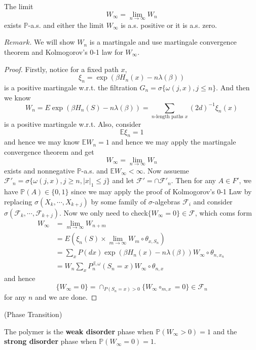 \begin{theorem}
    The limit
    \[W_{\infty} = \lim\limits_{n\to\infty} W_n\]
    exists $\mathbb{P}$-a.s. and either the limit $W_{\infty}$ is a.s. positive or it is a.s. zero.
\end{theorem}
$Remark$. We will show $W_n$ is a martingale and use martingale convergence theorem and Kolmogorov's 0-1 law for $W_{\infty}$.
\begin{proof}
    Firstly, notice for a fixed path $x$,
    \[
    \xi_n = \exp{(\beta H_n(x)- n\lambda(\beta))}
    \]
    is a positive martingale w.r.t. the filtration $G_n = \sigma\{\omega(j,x), j\leq n\}$. And then we know
    \[
    W_n = E \exp(\beta H_n(S) - n\lambda(\beta)) = \sum\limits_{n\text{-length paths }x}(2d)^{-1} \xi_n(x)
    \]
    is a positive martingale w.r.t. Also, consider
    \[
    \mathbb{E}\xi_n = 1 
    \]
    and hence we may know $\mathbb{E}W_n = 1$ and hence we may apply the martingale convergence theorem and get
    \[
    W_{\infty} = \lim_{n\to\infty} W_n
    \]
    exists and nonnegative $\mathbb{P}$-a.s. and $\mathbb{E}W_{\infty} < \infty$. Now assueme $\mathcal{F}'_n = \sigma\{\omega(j,x), j \geq n, |x|_1 \leq j\}$ and let $\mathcal{F}' = \cap \mathcal{F}'_n$. Then for any $A \in F'$, we have $\mathbb{P}(A)\in\{0,1\}$ since we may apply the proof of Kolmogorov's 0-1 Law by replacing $\sigma(X_k,\cdots,X_{k+j})$ by some family of $\sigma$-algebras $\mathcal{F}_i$ and consider $\sigma(\mathcal{F}_k,\cdots,\mathcal{F}_{k+j})$. Now we only need to check$\{W_{\infty} = 0\} \in \mathcal{F}$, which coms form 
    \[
    \begin{aligned}
        W_{\infty} &= \lim_{m\to\infty} W_{n+m} \\
        &= E(\xi_n(S)\times \lim_{m\to\infty}W_m \circ \theta_{x,S_n}) \\
        &= \sum\limits_{x} P(dx)\exp({\beta H_n(x) -n\lambda(\beta)})W_{\infty}\circ \theta_{n,x_n}\ \\
        &= W_n \sum_{x} P_n^{\beta,\omega}(S_n = x) W_{\infty} \circ \theta_{n,x}
    \end{aligned}
    \]
    and hence
    \[
    \{W_{\infty} = 0\} = \cap_{P(S_n = x) > 0} \{W_{\infty}\circ_{m,x} = 0\} \in \mathcal{F}_n 
    \]
    for any $n$ and we are done.
\end{proof}

\begin{definition}
    (Phase Transition)\par
    The polymer is the \textbf{weak disorder} phase when $\mathbb{P}(W_{\infty} > 0) = 1$ and the \textbf{strong disorder} phase when $\mathbb{P}(W_{\infty} = 0) = 1$.
\end{definition}


